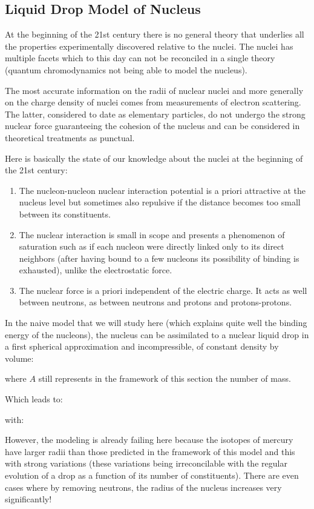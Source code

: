 	\pagebreak
	\subsection{Liquid Drop Model of Nucleus}
	At the beginning of the 21st century there is no general theory that underlies all the properties experimentally discovered relative to the nuclei. The nuclei has multiple facets which to this day can not be reconciled in a single theory (quantum chromodynamics not being able to model the nucleus).

	The most accurate information on the radii of nuclear nuclei and more generally on the charge density of nuclei comes from measurements of electron scattering. The latter, considered to date as elementary particles, do not undergo the strong nuclear force guaranteeing the cohesion of the nucleus and can be considered in theoretical treatments as punctual.

	Here is basically the state of our knowledge about the nuclei at the beginning of the 21st century:
	\begin{enumerate}
		\item The nucleon-nucleon nuclear interaction potential is a priori attractive at the nucleus level but sometimes also repulsive if the distance becomes too small between its constituents.

		\item The nuclear interaction is small in scope and presents a phenomenon of saturation such as if each nucleon were directly linked only to its direct neighbors (after having bound to a few nucleons its possibility of binding is exhausted), unlike  the electrostatic force.

		\item The nuclear force is a priori independent of the electric charge. It acts as well between neutrons, as between neutrons and protons and protons-protons.
	\end{enumerate}
	In the naive model that we will study here (which explains quite well the binding energy of the nucleons), the nucleus can be assimilated to a nuclear liquid drop in a first spherical approximation and incompressible, of constant density by volume:
	
	where $A$ still represents in the framework of this section the number of mass.

	Which leads to:
	
	with:
	
	However, the modeling is already failing here because the isotopes of mercury have larger radii than those predicted in the framework of this model and this with strong variations (these variations being irreconcilable with the regular evolution of a drop as a function of its number of constituents). There are even cases where by removing neutrons, the radius of the nucleus increases very significantly!

